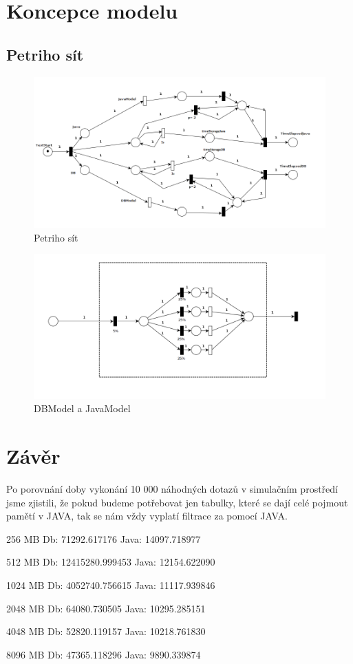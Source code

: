\documentclass[a4paper, 11pt]{article}
\begin{document}
\section{Koncepce modelu}

\subsection{Petriho sít}
\begin{figure}[H]
\centering
\includegraphics[width=150mm]{images/Petri-net-1.png}
\caption{Petriho sít}
\end{figure}

\begin{figure}[H]
\centering
\includegraphics[width=150mm]{images/Petri-net-2.png}
\caption{DBModel a JavaModel}
\end{figure}


\section{Závěr}
Po porovnání doby vykonání 10 000 náhodných dotazů v simulačním prostředí jsme zjistili, že pokud budeme potřebovat jen tabulky, které se dají celé pojmout pamětí v JAVA, tak se nám vždy vyplatí filtrace za pomocí JAVA.

256 MB
Db: 71292.617176
Java: 14097.718977

512 MB
Db: 12415280.999453
Java: 12154.622090

1024 MB
Db: 4052740.756615
Java: 11117.939846

2048 MB
Db: 64080.730505
Java: 10295.285151

4048 MB
Db: 52820.119157
Java: 10218.761830

8096 MB
Db: 47365.118296
Java: 9890.339874

\pagebreak
\newpage

\def\refname{Literatura}

\end{document}
